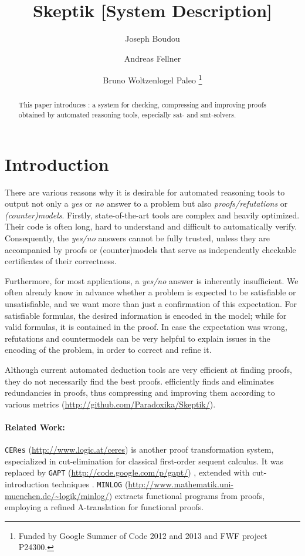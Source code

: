 \documentclass{llncs}
\title{ 
Skeptik [System Description]
}
\author{
  Joseph Boudou\inst{1}
  \and 
  Andreas Fellner\inst{2,3}
  \and 
  Bruno Woltzenlogel Paleo\inst{3}
  \thanks{Funded by Google Summer of Code 2012 and 2013 and FWF project P24300.}
}
\institute{
  IRIT, Universit\'e de Toulouse, France \\
  \email{joseph.boudou@irit.fr}
  \and 
  Free University of Bolzano, Italy \\
  \email{fellner.a@gmail.com}
  \and 
  Vienna University of Technology, Austria \\
  \email{bruno@logic.at}
}
\begin{document}
\maketitle


\begin{abstract}
This paper introduces \skeptik: a system for checking, compressing and improving proofs obtained by automated reasoning tools, especially sat- and smt-solvers.
\end{abstract}

\setcounter{footnote}{0}


\section{Introduction}

There are various reasons why it is desirable 
for automated reasoning
tools to output not only a \emph{yes} or \emph{no} answer to a problem 
but also \emph{proofs/refutations} or \emph{(counter)models}. 
%
Firstly, state-of-the-art tools are complex and heavily optimized. Their code is often long, hard to understand and difficult to automatically verify. Consequently, the \emph{yes/no} answers cannot be fully trusted, unless they are accompanied by proofs or (counter)models that serve as independently checkable certificates of 
their correctness. 

Furthermore, for most applications, a \emph{yes/no} answer is inherently insufficient. We often already know in advance whether a problem is expected to be satisfiable or unsatisfiable, and we want more than just a confirmation of this expectation. For satisfiable formulas, the desired information is encoded in the model; while for valid formulas, it is contained in the proof. In case the expectation was wrong, refutations and countermodels can be very helpful to explain issues in the encoding of the problem, in order to correct and refine it. 

Although current automated deduction tools are very efficient at finding proofs, they do not necessarily find the best proofs. {\skeptik} efficiently finds and eliminates redundancies in proofs, thus compressing and improving them according to various metrics (\url{http://github.com/Paradoxika/Skeptik/}).

\paragraph{Related Work:} \texttt{CERes} (\url{http://www.logic.at/ceres}) \cite{ToDo} is another proof transformation system, especialized in cut-elimination for classical first-order sequent calculus. It was replaced by \texttt{GAPT} (\url{http://code.google.com/p/gapt/}) \cite{ToDo}, extended with cut-introduction techniques \cite{ToDo}. \texttt{MINLOG} (\url{http://www.mathematik.uni-muenchen.de/~logik/minlog/}) \cite{ToDo} extracts functional programs from proofs, employing a refined A-translation for functional proofs.
\end{document}
